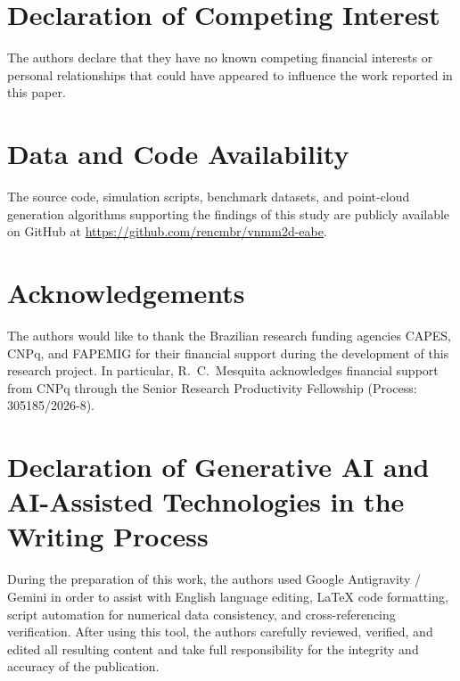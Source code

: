 \documentclass[preprint,12pt]{elsarticle}
\begin{document}
\section*{Declaration of Competing Interest}
The authors declare that they have no known competing financial interests or personal relationships that could have appeared to influence the work reported in this paper.

\section*{Data and Code Availability}
The source code, simulation scripts, benchmark datasets, and point-cloud generation algorithms supporting the findings of this study are publicly available on GitHub at \url{https://github.com/rencmbr/vnmm2d-eabe}.

\section*{Acknowledgements}
The authors would like to thank the Brazilian research funding agencies CAPES, CNPq, and FAPEMIG for their financial support during the development of this research project. In particular, R.~C.~Mesquita acknowledges financial support from CNPq through the Senior Research Productivity Fellowship (Process: 305185/2026-8).

\section*{Declaration of Generative AI and AI-Assisted Technologies in the Writing Process}
During the preparation of this work, the authors used Google Antigravity / Gemini in order to assist with English language editing, LaTeX code formatting, script automation for numerical data consistency, and cross-referencing verification. After using this tool, the authors carefully reviewed, verified, and edited all resulting content and take full responsibility for the integrity and accuracy of the publication.



\end{document}
